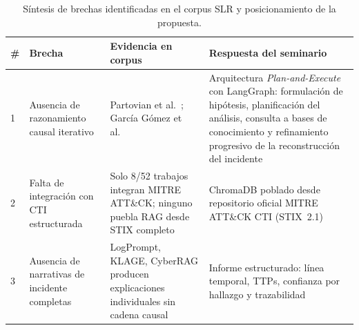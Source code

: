 \begin{table}[H]
\centering
\caption{Síntesis de brechas identificadas en el corpus SLR y
         posicionamiento de la propuesta.}
\label{tab:brechas}
\renewcommand{\arraystretch}{1.4}
\begin{tabularx}{\textwidth}{p{0.5cm} p{3.2cm} p{3.8cm} X}
\toprule
\textbf{\#} & \textbf{Brecha} & \textbf{Evidencia en corpus} & \textbf{Respuesta del seminario} \\
\midrule
1 &
  Ausencia de razonamiento causal iterativo &
Partovian et al.~\cite{partovian2024sms}; García Gómez et al.~\cite{garcia2026collaborative} &
Arquitectura \textit{Plan-and-Execute} con LangGraph: formulación de hipótesis, planificación del análisis, consulta a bases de conocimiento y refinamiento progresivo de la reconstrucción del incidente \\
2 &
  Falta de integración con CTI estructurada &
  Solo 8/52 trabajos integran MITRE ATT\&CK; ninguno puebla RAG desde STIX completo &
  ChromaDB poblado desde repositorio oficial MITRE ATT\&CK CTI (STIX~2.1) \\
3 &
  Ausencia de narrativas de incidente completas &
  LogPrompt, KLAGE, CyberRAG producen explicaciones individuales sin cadena causal &
  Informe estructurado: línea temporal, TTPs, confianza por hallazgo y trazabilidad \\
\bottomrule
\end{tabularx}
\end{table}


